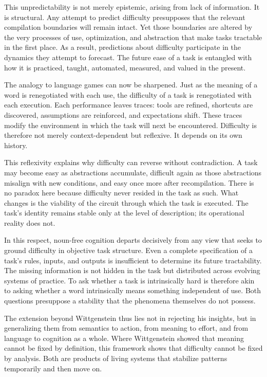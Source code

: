 \documentclass[12pt]{article}
\begin{document}
This unpredictability is not merely epistemic, arising from lack of information. It is structural. Any attempt to predict difficulty presupposes that the relevant compilation boundaries will remain intact. Yet those boundaries are altered by the very processes of use, optimization, and abstraction that make tasks tractable in the first place. As a result, predictions about difficulty participate in the dynamics they attempt to forecast. The future ease of a task is entangled with how it is practiced, taught, automated, measured, and valued in the present.

The analogy to language games can now be sharpened. Just as the meaning of a word is renegotiated with each use, the difficulty of a task is renegotiated with each execution. Each performance leaves traces: tools are refined, shortcuts are discovered, assumptions are reinforced, and expectations shift. These traces modify the environment in which the task will next be encountered. Difficulty is therefore not merely context-dependent but reflexive. It depends on its own history.

This reflexivity explains why difficulty can reverse without contradiction. A task may become easy as abstractions accumulate, difficult again as those abstractions misalign with new conditions, and easy once more after recompilation. There is no paradox here because difficulty never resided in the task as such. What changes is the viability of the circuit through which the task is executed. The task’s identity remains stable only at the level of description; its operational reality does not.

In this respect, noun-free cognition departs decisively from any view that seeks to ground difficulty in objective task structure. Even a complete specification of a task’s rules, inputs, and outputs is insufficient to determine its future tractability. The missing information is not hidden in the task but distributed across evolving systems of practice. To ask whether a task is intrinsically hard is therefore akin to asking whether a word intrinsically means something independent of use. Both questions presuppose a stability that the phenomena themselves do not possess.

The extension beyond Wittgenstein thus lies not in rejecting his insights, but in generalizing them from semantics to action, from meaning to effort, and from language to cognition as a whole. Where Wittgenstein showed that meaning cannot be fixed by definition, this framework shows that difficulty cannot be fixed by analysis. Both are products of living systems that stabilize patterns temporarily and then move on.
\end{document}
